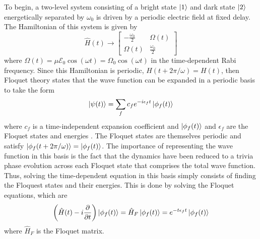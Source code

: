 To begin, a two-level system consisting of a bright state $\ket{1}$ and dark state $\ket{2}$ energetically separated by $\omega_0$ is driven by a periodic electric field at fixed delay.  The Hamiltonian of this system is given by 
\begin{equation}
	\hat{H}(t)\rightarrow
	\begin{bmatrix}
	-\frac{\omega_0}{2} & \Omega(t) \\
	\Omega(t) & \frac{\omega_0}{2}
	\end{bmatrix}
\end{equation}
where $\Omega(t)=\mu\mathcal{E}_0\cos(\omega t)=\Omega_0\cos(\omega t)$ in the time-dependent Rabi frequency.  Since this Hamiltonian is periodic, $H(t+2\pi/\omega)=H(t)$, then Floquet theory states that the wave function can be expanded in a periodic basis to take the form
\begin{equation}
	\ket{\psi(t)}=\sum_{f}c_f e^{-i \epsilon_f t}\ket{\phi_f(t)}
\end{equation}
where $c_f$ is a time-independent expansion coefficient and $\ket{\phi_f(t)}$ and $\epsilon_f$ are the Floquet states and energies \cite{shirleySolutionSchrOdinger1965}.  The Floquet states are themselves periodic and satisfy $\ket{\phi_f(t+2\pi/\omega)}=\ket{\phi_f(t)}$.  The importance of representing the wave function in this basis is the fact that the dynamics have been reduced to a trivia phase evolution across each Floquet state that comprises the total wave function.  Thus, solving the time-dependent \Schrodinger equation in this basis simply consists of finding the Floquest states and their energies. This is done by solving the Floquet equations, which are
\begin{equation}
\label{eqn:floquet_eqn}
	\bigg(\hat{H}(t)-i\frac{\partial}{\partial t}\bigg)\ket{\phi_f(t)}=\hat{H}_F\ket{\phi_f(t)}=e^{-t\epsilon_f t}\ket{\phi_f(t)}
\end{equation}
where $\hat{H}_F$ is the Floquet matrix.

